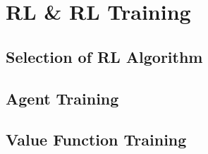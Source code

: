 \chapter{RL \& RL Training }
\section{Selection of RL Algorithm}

\section{Agent Training}

\section{Value Function Training}
